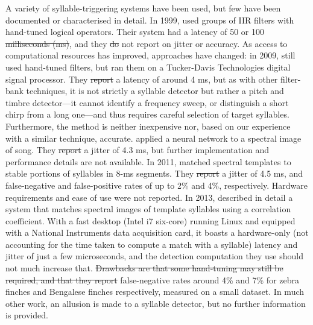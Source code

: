 \documentclass[10pt,letterpaper]{article}
\providecommand{\DIFaddtex}[1]{{\protect\color{blue}\uwave{#1}}} %
\providecommand{\DIFdeltex}[1]{{\protect\color{red}\sout{#1}}}                      %
\providecommand{\DIFaddbegin}{} %
\providecommand{\DIFaddend}{} %
\providecommand{\DIFdelbegin}{} %
\providecommand{\DIFdelend}{} %
\providecommand{\DIFadd}[1]{\texorpdfstring{\DIFaddtex{#1}}{#1}} %
\providecommand{\DIFdel}[1]{\texorpdfstring{\DIFdeltex{#1}}{}} %
\begin{document}
A variety of syllable-triggering systems have been used, but few have
been documented or characterised in detail.  In 1999,
\cite{Leonardo1999} used groups of IIR filters with hand-tuned logical
operators.  Their system had a latency of 50 or 100 \DIFdelbegin \DIFdel{milliseconds (ms)}\DIFdelend \DIFaddbegin \DIFadd{ms}\DIFaddend ,
and they \DIFdelbegin \DIFdel{do }\DIFdelend \DIFaddbegin \DIFadd{did }\DIFaddend not report on jitter or accuracy.  As access to
computational resources has improved, approaches have changed: in
2009, \cite{Andalman2009} still used hand-tuned filters, but ran them
on a Tucker-Davis Technologies digital signal processor.  They \DIFdelbegin \DIFdel{report
}\DIFdelend \DIFaddbegin \DIFadd{reported
}\DIFaddend a latency of around 4 ms, but as with other filter-bank techniques, it
is not strictly a syllable detector but rather a pitch and timbre
detector---it cannot identify a frequency sweep, or distinguish a
short chirp from a long one---and thus requires careful selection of
target syllables.  Furthermore, the method is neither inexpensive nor,
based on our experience with a similar technique, accurate.
\cite{Keller2009} applied a neural network to a spectral image of
song.  They \DIFdelbegin \DIFdel{report }\DIFdelend \DIFaddbegin \DIFadd{reported }\DIFaddend a jitter of 4.3 ms, but further implementation and
performance details are not available.  In 2011, \cite{Warren2011}
matched spectral templates to stable portions of syllables in 8-ms
segments.  They \DIFdelbegin \DIFdel{report }\DIFdelend \DIFaddbegin \DIFadd{reported }\DIFaddend a jitter of 4.5 ms, and false-negative and
false-positive rates of up to 2\% and 4\%, respectively.  Hardware
requirements and ease of use were not reported.  In 2013,
\cite{Skocik2013} described in detail a system that matches spectral
images of template syllables using a correlation coefficient.  With a
fast desktop (Intel i7 six-core) running Linux and equipped with a
National Instruments data acquisition card, it boasts a hardware-only
(not accounting for the time taken to compute a match with a syllable)
latency and jitter of just a few microseconds, and the detection
computation they use should not much increase that.  \DIFdelbegin \DIFdel{Drawbacks are
that some hand-tuning may still be required, and that they report
}\DIFdelend \DIFaddbegin \DIFadd{They reported
}\DIFaddend false-negative rates around 4\% and 7\% for zebra finches and
Bengalese finches respectively, measured on a small dataset.  In much
other work, an allusion is made to a syllable detector, but no further
information is provided.
\end{document}
